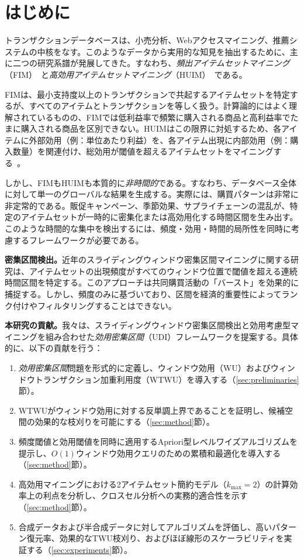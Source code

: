 \section{はじめに}
\label{sec:introduction}

トランザクションデータベースは、小売分析、Webアクセスマイニング、推薦システムの中核をなす。このようなデータから実用的な知見を抽出するために、主に二つの研究系譜が発展してきた。すなわち、\emph{頻出アイテムセットマイニング}（FIM）~\cite{agrawal1994fast}と\emph{高効用アイテムセットマイニング}（HUIM）~\cite{yao2006mining,fournier2019survey}である。

FIMは、最小支持度以上のトランザクションで共起するアイテムセットを特定するが、すべてのアイテムとトランザクションを等しく扱う。計算論的にはよく理解されているものの、FIMでは低利益率で頻繁に購入される商品と高利益率でたまに購入される商品を区別できない。HUIMはこの限界に対処するため、各アイテムに外部効用（例：単位あたり利益）を、各アイテム出現に内部効用（例：購入数量）を関連付け、総効用が閾値を超えるアイテムセットをマイニングする~\cite{liu2012mining,zida2015efim}。

しかし、FIMもHUIMも本質的に\emph{非時間的}である。すなわち、データベース全体に対して単一のグローバルな結果を生成する。実際には、購買パターンは非常に非定常的である。販促キャンペーン、季節効果、サプライチェーンの混乱が、特定のアイテムセットが一時的に密集化または高効用化する時間区間を生み出す。このような時間的な集中を検出するには、頻度・効用・時間的局所性を同時に考慮するフレームワークが必要である。

\textbf{密集区間検出。}近年のスライディングウィンドウ密集区間マイニングに関する研究は、アイテムセットの出現頻度がすべてのウィンドウ位置で閾値を超える連続時間区間を特定する。このアプローチは共同購買活動の「バースト」を効果的に捕捉する。しかし、頻度のみに基づいており、区間を経済的重要性によってランク付けやフィルタリングすることはできない。

\textbf{本研究の貢献。}我々は、スライディングウィンドウ密集区間検出と効用考慮型マイニングを組み合わせた\emph{効用密集区間}（UDI）フレームワークを提案する。具体的に、以下の貢献を行う：

\begin{enumerate}
    \item \emph{効用密集区間}問題を形式的に定義し、ウィンドウ効用（WU）およびウィンドウトランザクション加重利用度（WTWU）を導入する（\ref{sec:preliminaries}節）。
    \item WTWUがウィンドウ効用に対する反単調上界であることを証明し、候補空間の効果的な枝刈りを可能にする（\ref{sec:method}節）。
    \item 頻度閾値と効用閾値を同時に適用するApriori型レベルワイズアルゴリズムを提示し、$O(1)$ウィンドウ効用クエリのための累積和最適化を導入する（\ref{sec:method}節）。
    \item 高効用マイニングにおける2アイテムセット簡約モデル（$k_{\max} = 2$）の計算効率上の利点を分析し、クロスセル分析への実務的適合性を示す（\ref{sec:method}節）。
    \item 合成データおよび半合成データに対してアルゴリズムを評価し、高いパターン復元率、効果的なTWU枝刈り、およびほぼ線形のスケーラビリティを実証する（\ref{sec:experiments}節）。
\end{enumerate}

